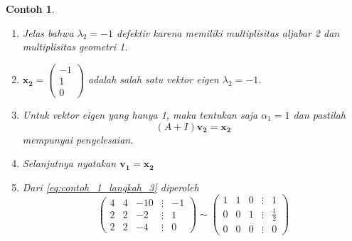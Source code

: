 \documentclass[a4paper]{article}
\theoremstyle{definisi}
\newtheorem{contoh}{Contoh}[section]
\numberwithin{equation}{section}
\begin{document}
\begin{contoh}
\begin{enumerate}[label=Langkah \arabic*: ,leftmargin=*]
      \begin{equation*}
        \mathbf{x_1}=\begin{pmatrix}
          1\\2\\1
        \end{pmatrix}
      \end{equation*}
      Jadi
      \begin{equation*}
        \mathbf{y_{\lambda_1}}=c_1\begin{pmatrix}
          1\\2\\1
        \end{pmatrix}e^t
      \end{equation*}
      adalah salah satu penyelesaian dari \eqref{eq:contoh_1}.\\
      \item Jelas bahwa $\lambda_2=-1$ \textit{defektiv} karena memiliki multiplisitas aljabar 2 dan multiplisitas geometri 1.
      \item $\mathbf{x_2}=\begin{pmatrix}
        -1\\1\\0
      \end{pmatrix}$ adalah salah satu vektor eigen $\lambda_2=-1$.
      \item Untuk vektor eigen yang hanya 1, maka tentukan saja $\alpha_1=1$ dan pastilah
      \begin{equation}\label{eq:contoh_1_langkah_3}
        (A+I)\mathbf{v_2}=\mathbf{x_2}
      \end{equation}
      mempunyai penyelesaian.
      \item Selanjutnya nyatakan $\mathbf{v_1}=\mathbf{x_2}$ 
      \item Dari \eqref{eq:contoh_1_langkah_3} diperoleh
      \begin{equation*}
        \begin{pmatrix}
          4&4&-10&\vdots&-1\\
          2&2&-2&\vdots&1\\
          2&2&-4&\vdots&0
        \end{pmatrix}
        \sim
        \begin{pmatrix}
          1&1&0&\vdots&1\\
          0&0&1&\vdots&\frac{1}{2}\\
          0&0&0&\vdots&0
        \end{pmatrix}
      \end{equation*}

\end{enumerate}
\end{contoh}
\end{document}
